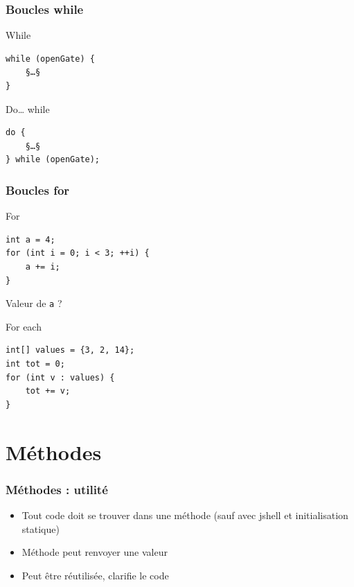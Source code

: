 \documentclass[english, french]{beamer}
\begin{document}
\begin{frame}[fragile]
	\frametitle{Boucles while}
	\begin{block}{While}
		\begin{lstlisting}
while (openGate) {
	§…§
}
		\end{lstlisting}	
	\end{block}
	\begin{block}{Do… while}
		\begin{lstlisting}
do {
	§…§
} while (openGate);
		\end{lstlisting}	
	\end{block}
\end{frame}

\begin{frame}[fragile]
	\frametitle{Boucles for}
	\begin{block}{For}
		\begin{lstlisting}
int a = 4;
for (int i = 0; i < 3; ++i) {
	a += i;
}
		\end{lstlisting}	
	\end{block}
	Valeur de \texttt{a} ? \onslide<2->{\texttt{7}}
	\begin{block}{For each}
		\begin{lstlisting}
int[] values = {3, 2, 14};
int tot = 0;
for (int v : values) {
	tot += v;
}
		\end{lstlisting}	
	\end{block}
\end{frame}

\section{Méthodes}
\begin{frame}[fragile]
	\frametitle{Méthodes : utilité}
	\begin{itemize}
		\item Tout code doit se trouver dans une méthode {\tiny (sauf avec jshell et initialisation statique)}
		\item Méthode peut renvoyer une valeur
		\item Peut être réutilisée, clarifie le code
	\end{itemize}
\end{frame}
\end{document}
